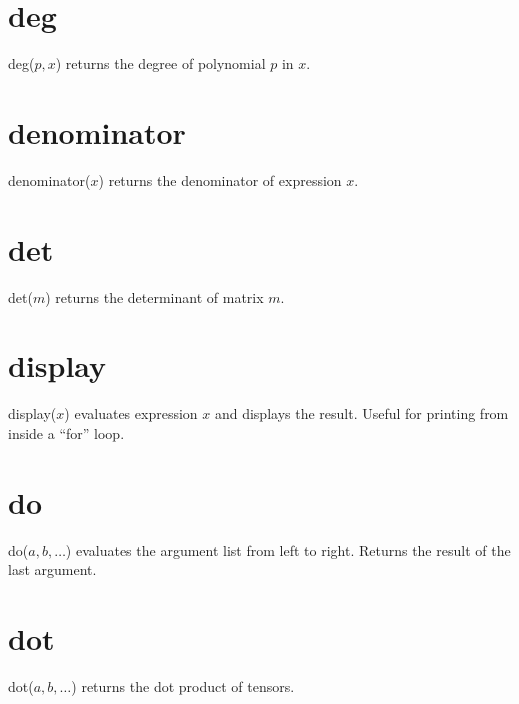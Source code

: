 \documentclass[12pt,openany]{report}
\begin{document}
\section*{deg}
deg($p,x$) returns the degree of polynomial $p$ in $x$.

\section*{denominator}
denominator($x$) returns the denominator of expression $x$.

\section*{det}
det($m$) returns the determinant of matrix $m$.

\section*{display}
display($x$) evaluates expression $x$ and displays the result.
Useful for printing from inside a ``for'' loop.

\section*{do}
do($a,b,\ldots$) evaluates the argument list from left to right.
Returns the result of the last argument.

\section*{dot}
dot($a,b,\ldots$) returns the dot product of tensors.
\end{document}
